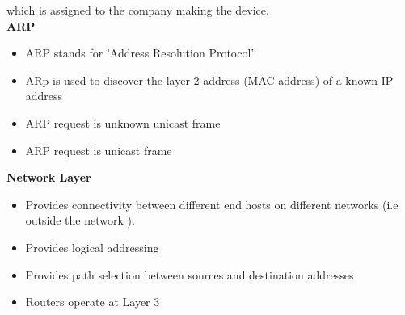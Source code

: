 \documentclass{report}
\begin{document}
	which is assigned to the company making the device.\\ 
	\textbf{ARP}
	\begin{itemize}
		\item ARP stands for 'Address Resolution Protocol'

		\item ARp is used to discover the layer 2 address (MAC address) of a known IP
			address

		\item ARP request is unknown unicast frame

		\item ARP request is unicast frame
	\end{itemize}

	\textbf{Network Layer}
	\begin{itemize}
		\item Provides connectivity between different end hosts on different networks
			(i.e outside the network ).

		\item Provides logical addressing

		\item Provides path selection between sources and destination addresses

		\item Routers operate at Layer 3
	\end{itemize}
\end{document}
